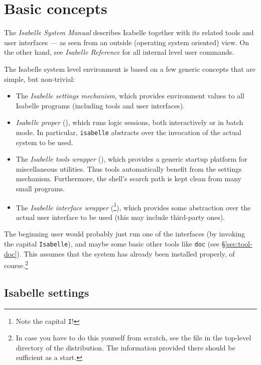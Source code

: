 

\chapter{Basic concepts}

The \emph{Isabelle System Manual} describes Isabelle together with its
related tools and user interfaces --- as seen from an outside
(operating system oriented) view.  On the other hand, see
\emph{Isabelle Reference} for all internal {\ML} level user commands.

\medskip The Isabelle system level environment is based on a few
generic concepts that are simple, but non-trivial:
\begin{itemize}
\item The \emph{Isabelle settings mechanism}, which provides
  environment values to all Isabelle programs (including tools and
  user interfaces).
\item \emph{Isabelle proper} (), which runs logic
  sessions, both interactively or in batch mode. In particular,
  \texttt{isabelle} abstracts over the invocation of the actual {\ML}
  system to be used.
\item The \emph{Isabelle tools wrapper} (), which
  provides a generic startup platform for miscellaneous utilities.
  Thus tools automatically benefit from the settings mechanism.
  Furthermore, the shell's search path is kept clean from many small
  programs.
\item The \emph{Isabelle interface wrapper}
  (\footnote{Note the capital \texttt{I}!}), which
  provides some abstraction over the actual user interface to be used
  (this may include third-party ones).
\end{itemize}

\medskip The beginning user would probably just run one of the
interfaces (by invoking the capital \texttt{Isabelle}), and maybe some
basic other tools like \texttt{doc} (see \S\ref{sec:tool-doc}).  This
assumes that the system has already been installed properly, of
course.\footnote{In case you have to do this yourself from scratch,
  see the  file in the top-level directory of the
  distribution. The information provided there should be sufficient as
  a start.}


\section{Isabelle settings} \label{sec:settings}

